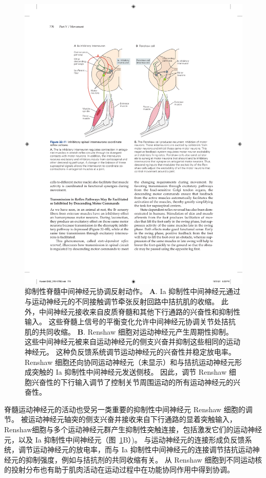 \begin{figure}[htbp]
	\centering
	\includegraphics[width=0.75\linewidth]{chap32/fig_32_11}
	\caption{抑制性脊髓中间神经元协调反射动作。
	\textbf{A}. Ia 抑制性中间神经元通过与运动神经元的不同接触调节牵张反射回路中拮抗肌的收缩。
	此外，中间神经元接收来自皮质脊髓和其他下行通路的兴奋性和抑制性输入。
	这些脊髓上信号的平衡变化允许中间神经元协调关节处拮抗肌的共同收缩。
	\textbf{B}. Renshaw 细胞对运动神经元产生周期性抑制。
	这些中间神经元被来自运动神经元的侧支兴奋并抑制这些相同的运动神经元。
	这种负反馈系统调节运动神经元的兴奋性并稳定放电率。
	Renshaw 细胞还向协同运动神经元（未显示）和与拮抗运动神经元形成突触的 Ia 抑制性中间神经元发送侧枝。
	因此，调节 Renshaw 细胞兴奋性的下行输入调节了控制关节周围运动的所有运动神经元的兴奋性。}
	\label{fig:32_11}
\end{figure}


脊髓运动神经元的活动也受另一类重要的抑制性中间神经元 Renshaw 细胞的调节。
被运动神经元轴突的侧支兴奋并接收来自下行通路的显着突触输入，Renshaw细胞与多个运动神经元群产生抑制性突触连接，包括激发它们的运动神经元，以及 Ia 抑制性中间神经元（图~\ref{fig:32_11}B）)。
与运动神经元的连接形成负反馈系统，调节运动神经元的放电率，而与 Ia 抑制性中间神经元的连接调节拮抗运动神经元的抑制强度，例如与拮抗剂的共同收缩有关。
从 Renshaw 细胞到不同运动核的投射分布也有助于肌肉活动在运动过程中在功能协同作用中得到协调。



